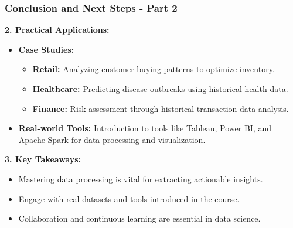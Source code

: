 \documentclass[aspectratio=169]{beamer}
\begin{document}
\begin{frame}[fragile]
    \frametitle{Conclusion and Next Steps - Part 2}
    
    \textbf{2. Practical Applications:}
    \begin{itemize}
        \item \textbf{Case Studies:}
        \begin{itemize}
            \item \textbf{Retail:} Analyzing customer buying patterns to optimize inventory.
            \item \textbf{Healthcare:} Predicting disease outbreaks using historical health data.
            \item \textbf{Finance:} Risk assessment through historical transaction data analysis.
        \end{itemize}
        \item \textbf{Real-world Tools:} Introduction to tools like Tableau, Power BI, and Apache Spark for data processing and visualization.
    \end{itemize}

    \textbf{3. Key Takeaways:}
    \begin{itemize}
        \item Mastering data processing is vital for extracting actionable insights.
        \item Engage with real datasets and tools introduced in the course.
        \item Collaboration and continuous learning are essential in data science.
    \end{itemize}
\end{frame}
\end{document}
